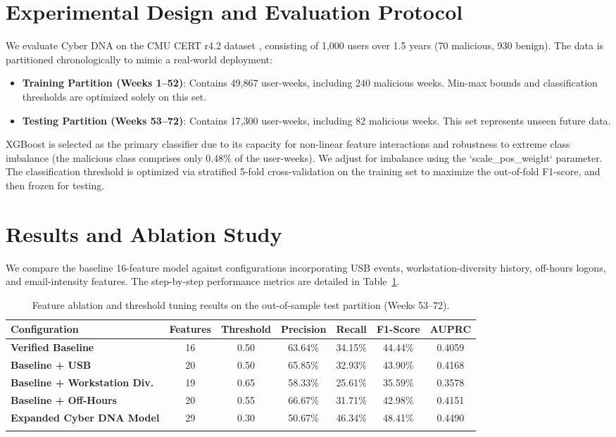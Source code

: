 \documentclass[pdflatex,sn-mathphys-num]{sn-jnl}
\theoremstyle{thmstyleone}
\theoremstyle{thmstyletwo}
\theoremstyle{thmstylethree}
\begin{document}
\section{Experimental Design and Evaluation Protocol}\label{sec4}
We evaluate Cyber DNA on the CMU CERT r4.2 dataset \cite{cert2020dataset}, consisting of 1,000 users over 1.5 years (70 malicious, 930 benign). The data is partitioned chronologically to mimic a real-world deployment:
\begin{itemize}
    \item \textbf{Training Partition (Weeks 1--52)}: Contains 49,867 user-weeks, including 240 malicious weeks. Min-max bounds and classification thresholds are optimized solely on this set.
    \item \textbf{Testing Partition (Weeks 53--72)}: Contains 17,300 user-weeks, including 82 malicious weeks. This set represents unseen future data.
\end{itemize}

XGBoost \cite{chen2016xgboost} is selected as the primary classifier due to its capacity for non-linear feature interactions and robustness to extreme class imbalance (the malicious class comprises only 0.48\% of the user-weeks). We adjust for imbalance using the `scale\_pos\_weight` parameter. The classification threshold is optimized via stratified 5-fold cross-validation on the training set to maximize the out-of-fold F1-score, and then frozen for testing.

\section{Results and Ablation Study}\label{sec5}
We compare the baseline 16-feature model against configurations incorporating USB events, workstation-diversity history, off-hours logons, and email-intensity features. The step-by-step performance metrics are detailed in Table~\ref{tab:ablation}.

\begin{table}[h]
\caption{Feature ablation and threshold tuning results on the out-of-sample test partition (Weeks 53--72).}\label{tab:ablation}
\begin{tabular*}{\textwidth}{@{\extracolsep\fill}lcccccc}
\toprule
Configuration & Features & Threshold & Precision & Recall & F1-Score & AUPRC \\
\midrule
\textbf{Verified Baseline} & 16 & 0.50 & 63.64\% & 34.15\% & 44.44\% & 0.4059 \\
\textbf{Baseline + USB} & 20 & 0.50 & 65.85\% & 32.93\% & 43.90\% & 0.4168 \\
\textbf{Baseline + Workstation Div.} & 19 & 0.65 & 58.33\% & 25.61\% & 35.59\% & 0.3578 \\
\textbf{Baseline + Off-Hours} & 20 & 0.55 & 66.67\% & 31.71\% & 42.98\% & 0.4151 \\
\textbf{Expanded Cyber DNA Model} & 29 & 0.30 & 50.67\% & 46.34\% & 48.41\% & 0.4490 \\
\botrule
\end{tabular*}
\end{table}
\end{document}
